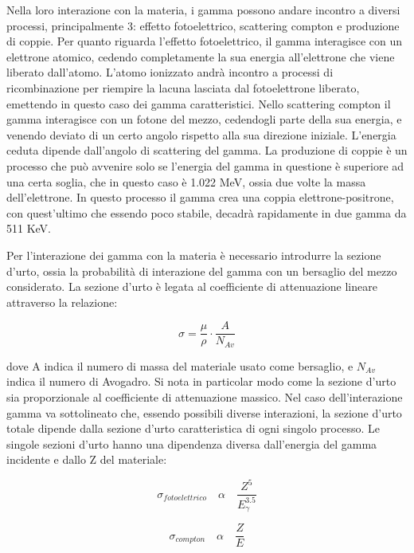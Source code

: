 \documentclass[a4paper,10pt]{article}
\begin{document}
Nella loro interazione con la materia, i gamma possono andare incontro a diversi processi, principalmente 3: effetto fotoelettrico, scattering compton e produzione di coppie. Per quanto riguarda l'effetto fotoelettrico, il gamma interagisce con un elettrone atomico, cedendo completamente la sua energia all'elettrone che viene liberato dall'atomo. L'atomo ionizzato andrà incontro a processi di ricombinazione per riempire la lacuna lasciata dal fotoelettrone liberato, emettendo in questo caso dei gamma caratteristici. Nello scattering compton il gamma interagisce con un fotone del mezzo, cedendogli parte della sua energia, e venendo deviato di un certo angolo rispetto alla sua direzione iniziale. L'energia ceduta dipende dall'angolo di scattering del gamma. La produzione di coppie è un processo che può avvenire solo se l'energia del gamma in questione è superiore ad una certa soglia, che in questo caso è 1.022 MeV, ossia due volte la massa dell'elettrone. In questo processo il gamma crea una coppia  elettrone-positrone, con quest'ultimo che essendo poco stabile, decadrà rapidamente in due gamma da 511 KeV. 

Per l'interazione dei gamma con la materia è necessario introdurre la sezione d'urto, ossia la probabilità di interazione del gamma con un bersaglio del mezzo considerato. La sezione d'urto è legata al coefficiente di attenuazione lineare attraverso la relazione:

\begin{equation}
	\sigma=\frac{\mu}{\rho} \cdot \frac{A}{N_{Av}}
\end{equation}

dove A indica il numero di massa del materiale usato come bersaglio, e $N_{Av}$ indica il numero di Avogadro. Si nota in particolar modo come la sezione d'urto sia proporzionale al coefficiente di attenuazione massico. Nel caso dell'interazione gamma va sottolineato che, essendo possibili diverse interazioni, la sezione d'urto totale dipende dalla sezione d'urto caratteristica di ogni singolo processo. Le singole sezioni d'urto hanno una dipendenza diversa dall'energia del gamma incidente e dallo Z del materiale:

\begin{equation}
	\sigma_{fotoelettrico}\quad  \alpha \quad  \frac{Z^5}{E_{\gamma}^{3.5}}
\end{equation}

\begin{equation}
	\sigma_{compton}\quad  \alpha \quad  \frac{Z}{E}
\end{equation}
\end{document}
